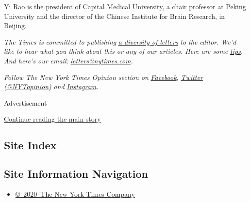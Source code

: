 Yi Rao is the president of Capital Medical University, a chair professor
at Peking University and the director of the Chinese Institute for Brain
Research, in Beijing.

\emph{The Times is committed to publishing}
\href{https://www.nytimes.com/2019/01/31/opinion/letters/letters-to-editor-new-york-times-women.html}{\emph{a
diversity of letters}} \emph{to the editor. We'd like to hear what you
think about this or any of our articles. Here are some}
\href{https://help.nytimes.com/hc/en-us/articles/115014925288-How-to-submit-a-letter-to-the-editor}{\emph{tips}}\emph{.
And here's our email:}
\href{mailto:letters@nytimes.com}{\emph{letters@nytimes.com}}\emph{.}

\emph{Follow The New York Times Opinion section on}
\href{https://www.facebook.com/nytopinion}{\emph{Facebook}}\emph{,}
\href{http://twitter.com/NYTOpinion}{\emph{Twitter (@NYTopinion)}}
\emph{and}
\href{https://www.instagram.com/nytopinion/}{\emph{Instagram}}\emph{.}

Advertisement

\protect\hyperlink{after-bottom}{Continue reading the main story}

\hypertarget{site-index}{%
\subsection{Site Index}\label{site-index}}

\hypertarget{site-information-navigation}{%
\subsection{Site Information
Navigation}\label{site-information-navigation}}

\begin{itemize}
\tightlist
\item
  \href{https://help.nytimes.com/hc/en-us/articles/115014792127-Copyright-notice}{©~2020~The
  New York Times Company}
\end{itemize}


